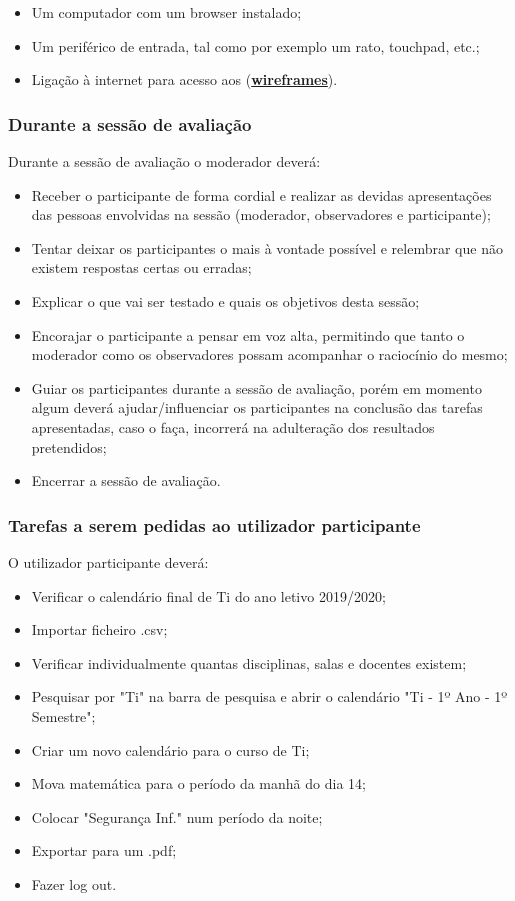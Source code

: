 \documentclass[11pt, twoside]{report}
\begin{document}
	\begin{itemize}
		\item Um computador com um browser instalado;
		\item Um periférico de entrada, tal como por exemplo um rato, touchpad, etc.;
		\item Ligação à internet para acesso aos (\href{https://www.figma.com/file/nhb5nnIrt3fdDoQhYpsN80/Calendario?node-id=9\%3A154}{\textbf{wireframes}}).
	\end{itemize}
	
	\subsubsection*{Durante a sessão de avaliação}	
	Durante a sessão de avaliação o moderador deverá:
	
	\begin{itemize}
		\item Receber o participante de forma cordial e realizar as devidas apresentações das pessoas envolvidas na sessão (moderador, observadores e participante);
		\item Tentar deixar os participantes o mais à vontade possível e relembrar que não existem respostas certas ou erradas;
		\item Explicar o que vai ser testado e quais os objetivos desta sessão;
		\item Encorajar o participante a pensar em voz alta, permitindo que tanto o moderador como os observadores possam acompanhar o raciocínio do mesmo;
		\item Guiar os participantes durante a sessão de avaliação, porém em momento algum deverá ajudar/influenciar os participantes na conclusão das tarefas apresentadas, caso o faça, incorrerá na adulteração dos resultados pretendidos;
		\item Encerrar a sessão de avaliação.
	\end{itemize}
	
	\subsubsection*{Tarefas a serem pedidas ao utilizador participante}	
	O utilizador participante deverá:
	
	\begin{itemize}
		\item Verificar o calendário final de Ti do ano letivo 2019/2020;
		\item Importar ficheiro .csv;
		\item Verificar individualmente quantas disciplinas, salas e docentes existem;
		\item Pesquisar por "Ti" na barra de pesquisa e abrir o calendário "Ti - 1º Ano - 1º Semestre";
		\item Criar um novo calendário para o curso de Ti;
		\item Mova matemática para o período da manhã do dia 14;
		\item Colocar "Segurança Inf." num período da noite;
		\item Exportar para um .pdf;
		\item Fazer log out.
	\end{itemize}
	
\end{document}
